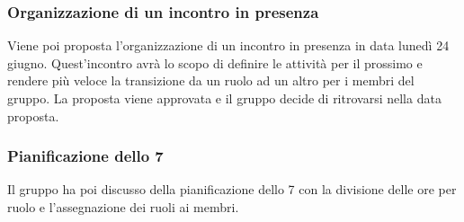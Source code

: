 \subsubsection{Organizzazione di un incontro in presenza}
\par Viene poi proposta l'organizzazione di un incontro in presenza in data lunedì 24 giugno. Quest'incontro avrà lo scopo di definire le attività per il prossimo  e rendere più veloce la transizione da un ruolo ad un altro per i membri del gruppo. La proposta viene approvata e il gruppo decide di ritrovarsi nella data proposta.

\subsubsection{Pianificazione dello  7}
\par Il gruppo ha poi discusso della pianificazione dello  7 con la divisione delle ore per ruolo e l'assegnazione dei ruoli ai membri.